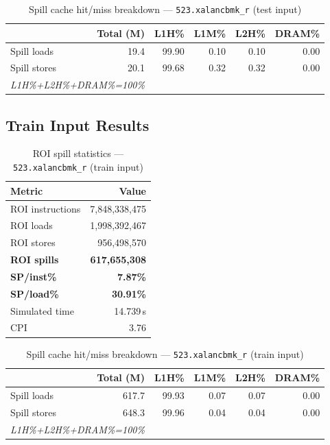 \documentclass[11pt,a4paper]{article}
\begin{document}
\begin{table}[H]
\centering
\caption{Spill cache hit/miss breakdown --- \texttt{523.xalancbmk\_r} (test input)}
\label{tab:xalancbmk_test_cache}
\begin{tabular}{lrrrrr}
\toprule
\textbf{} & \textbf{Total (M)} & \textbf{L1H\%} & \textbf{L1M\%} & \textbf{L2H\%} & \textbf{DRAM\%} \\
\midrule
Spill loads  & 19.4 & 99.90 & 0.10 & 0.10 & 0.00 \\
Spill stores & 20.1 & 99.68 & 0.32 & 0.32 & 0.00 \\
\multicolumn{2}{l}{\small\textit{L1H\%+L2H\%+DRAM\%=100\%}} \\
\bottomrule
\end{tabular}
\end{table}

\subsection{Train Input Results}

\begin{table}[H]
\centering
\caption{ROI spill statistics --- \texttt{523.xalancbmk\_r} (train input)}
\label{tab:xalancbmk_train_roi}
\begin{tabular}{lr}
\toprule
\textbf{Metric} & \textbf{Value} \\
\midrule
ROI instructions & 7,848,338,475 \\
ROI loads        & 1,998,392,467 \\
ROI stores       & 956,498,570 \\
\textbf{ROI spills}   & \textbf{617,655,308} \\
\textbf{SP/inst\%}   & \textbf{7.87\%} \\
\textbf{SP/load\%}   & \textbf{30.91\%} \\
Simulated time   & 14.739\,s \\
CPI              & 3.76 \\
\bottomrule
\end{tabular}
\end{table}

\begin{table}[H]
\centering
\caption{Spill cache hit/miss breakdown --- \texttt{523.xalancbmk\_r} (train input)}
\label{tab:xalancbmk_train_cache}
\begin{tabular}{lrrrrr}
\toprule
\textbf{} & \textbf{Total (M)} & \textbf{L1H\%} & \textbf{L1M\%} & \textbf{L2H\%} & \textbf{DRAM\%} \\
\midrule
Spill loads  & 617.7 & 99.93 & 0.07 & 0.07 & 0.00 \\
Spill stores & 648.3 & 99.96 & 0.04 & 0.04 & 0.00 \\
\multicolumn{2}{l}{\small\textit{L1H\%+L2H\%+DRAM\%=100\%}} \\
\bottomrule
\end{tabular}
\end{table}
\end{document}
